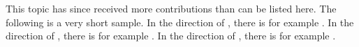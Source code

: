 

This topic has since received more contributions than can be listed here. The following is a very
short sample. In the direction of \citet{zafar2017fairnessconstraints}, there is for example
\citet{quadrianto2017recycling,ustun2019fairness,lohaus2020too}. In the direction of
\citet{kamiran2012data}, there is for example \citet{AgaBeyDudLanetal18,roh2021fairbatch}. In the
direction of \citet{hardt2016equality}, there is for example \citet{hebert2018multicalibration}.

